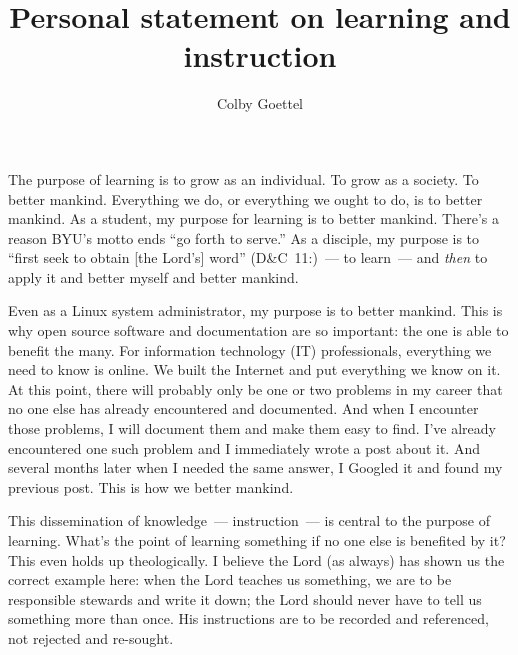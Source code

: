 \documentclass[man,natbib]{apa6}
\title{Personal statement on learning and instruction}
\author{Colby Goettel}
\affiliation{Brigham Young University}
\newcommand\vref[3]{(#1~#2\thinspace:\thinspace#3)}
\begin{document}
\maketitle

The purpose of learning is to grow as an individual. To grow as a society. To better mankind. Everything we do, or everything we ought to do, is to better mankind. As a student, my purpose for learning is to better mankind. There's a reason BYU's motto ends ``go forth to serve.'' As a disciple, my purpose is to ``first seek to obtain [the Lord's] word'' \vref{D\&C}{11}{21}~--- to learn~--- and \emph{then} to apply it and better myself and better mankind.

Even as a Linux system administrator, my purpose is to better mankind. This is why open source software and documentation are so important: the one is able to benefit the many. For information technology (IT) professionals, everything we need to know is online. We built the Internet and put everything we know on it. At this point, there will probably only be one or two problems in my career that no one else has already encountered and documented. And when I encounter those problems, I will document them and make them easy to find. I've already encountered one such problem and I immediately wrote a post about it. And several months later when I needed the same answer, I Googled it and found my previous post. This is how we better mankind.

This dissemination of knowledge~--- instruction~--- is central to the purpose of learning. What's the point of learning something if no one else is benefited by it? This even holds up theologically. I believe the Lord (as always) has shown us the correct example here: when the Lord teaches us something, we are to be responsible stewards and write it down; the Lord should never have to tell us something more than once. His instructions are to be recorded and referenced, not rejected and re-sought.

\end{document}
